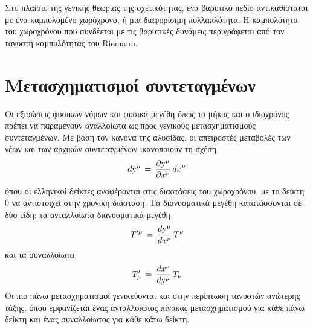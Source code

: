 Στο πλαίσιο της γενικής θεωρίας της σχετικότητας, ένα βαρυτικό πεδίο αντικαθίσταται με ένα καμπυλομένο χωρόχρονο, ή μια διαφορίσιμη πολλαπλότητα. Η καμπυλότητα του χωροχρόνου που συνδέεται με τις βαρυτικές δυνάμεις περιγράφεται από τον τανυστή καμπυλότητας του Riemann.
\\ 

\section{Μετασχηματισμοί συντεταγμένων}
Οι εξισώσεις φυσικών νόμων και φυσικά μεγέθη όπως το μήκος και ο ιδιοχρόνος πρέπει να παραμένουν αναλλοίωτα ως προς γενικούς μετασχηματισμούς συντεταγμένων. Με βάση τον κανόνα της αλυσίδας, οι απειροστές μεταβολές των νέων και των αρχικών συντεταγμένων ικανοποιούν τη σχέση 
\begin{equation}\label{dtransf}
    d\y\indices{^\mu} \,=\, \frac{\partial \y\indices{^\mu}}{\partial x\indices{^\nu}}\,dx\indices{^\nu}
\end{equation}
όπου οι ελληνικοί δείκτες αναφέρονται στις διαστάσεις του χωροχρόνου, με το δείκτη $0$ να αντιστοιχεί στην χρονική διάσταση.
Τα διανυσματικά μεγέθη 
κατατάσσονται σε δύο είδη: τα ανταλλοίωτα διανυσματικά μεγέθη
\begin{equation}
    T'^{\mu}\,=\,\frac{d\text{y}^{\mu}}{dx^{\nu}}\,T^{\nu}
\end{equation}
και τα συναλλοίωτα
\begin{equation}
    T'_{\mu}\,=\,\frac{dx^{\nu}}{d\text{y}^{\mu}}\,T_{\nu}
\end{equation}
Οι πιο πάνω μετασχηματισμοί γενικεύονται και στην περίπτωση τανυστών ανώτερης τάξης, όπου εμφανίζεται ένας ανταλλοίωτος πίνακας μετασχηματισμού για κάθε πάνω δείκτη και ένας συναλλοίωτος για κάθε κάτω δείκτη.
\\

